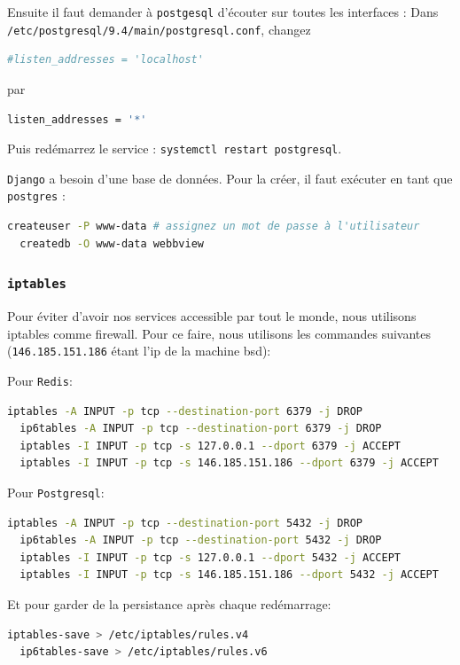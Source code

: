 \documentclass[10pt,a4paper]{article}
\begin{document}
Ensuite il faut demander à \texttt{postgesql} d'écouter sur toutes les interfaces :
Dans \\\texttt{/etc/postgresql/9.4/main/postgresql.conf}, changez
\begin{lstlisting}[language=bash]
  #listen_addresses = 'localhost'
\end{lstlisting}
par
\begin{lstlisting}[language=bash]
  listen_addresses = '*'
\end{lstlisting}

Puis redémarrez le service : \texttt{systemctl restart postgresql}.

\texttt{Django} a besoin d'une base de données.
Pour la créer, il faut exécuter en tant que \texttt{postgres} :
\begin{lstlisting}[language=bash]
  createuser -P www-data # assignez un mot de passe à l'utilisateur
  createdb -O www-data webbview
\end{lstlisting}

\subsubsection{\texttt{iptables}}
Pour éviter d'avoir nos services accessible par tout le monde, nous utilisons iptables comme firewall.
Pour ce faire, nous utilisons les commandes suivantes
(\texttt{146.185.151.186} étant l'ip de la machine bsd):


Pour \texttt{Redis}:
\begin{lstlisting}[language=bash]
  iptables -A INPUT -p tcp --destination-port 6379 -j DROP
  ip6tables -A INPUT -p tcp --destination-port 6379 -j DROP
  iptables -I INPUT -p tcp -s 127.0.0.1 --dport 6379 -j ACCEPT
  iptables -I INPUT -p tcp -s 146.185.151.186 --dport 6379 -j ACCEPT
\end{lstlisting}

Pour \texttt{Postgresql}:
\begin{lstlisting}[language=bash]
  iptables -A INPUT -p tcp --destination-port 5432 -j DROP
  ip6tables -A INPUT -p tcp --destination-port 5432 -j DROP
  iptables -I INPUT -p tcp -s 127.0.0.1 --dport 5432 -j ACCEPT
  iptables -I INPUT -p tcp -s 146.185.151.186 --dport 5432 -j ACCEPT
\end{lstlisting}

Et pour garder de la persistance après chaque redémarrage:
\begin{lstlisting}[language=bash]
  iptables-save > /etc/iptables/rules.v4
  ip6tables-save > /etc/iptables/rules.v6
\end{lstlisting}
\end{document}
